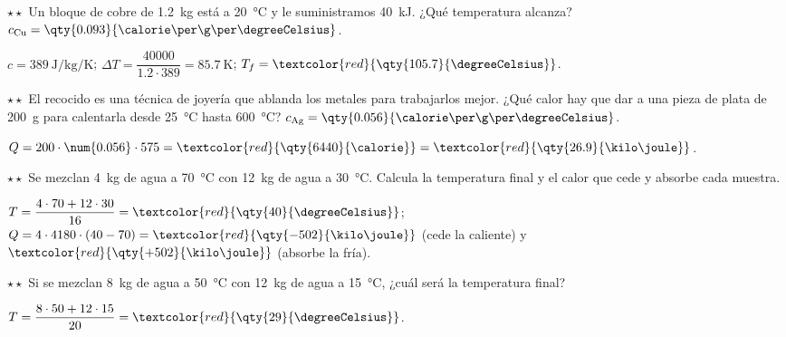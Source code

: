 \begin{exercise}
    \(\star\star\) Un bloque de cobre de \qty{1.2}{\kg} está a \qty{20}{\degreeCelsius} y le suministramos \qty{40}{\kilo\joule}. ¿Qué
    temperatura alcanza? \(c_{\text{Cu}} = \qty{0.093}{\calorie\per\g\per\degreeCelsius}\).
    \begin{solu}
        \(c = \qty{389}{\joule\per\kg\per\kelvin}\); \(\Delta T = \dfrac{40000}{\num{1.2} \cdot 389} = \qty{85.7}{\kelvin}\);
        \(T_f = \textcolor{red}{\qty{105.7}{\degreeCelsius}}\).
    \end{solu}
\end{exercise}

\begin{exercise}
    \(\star\star\) El recocido es una técnica de joyería que ablanda los metales para trabajarlos mejor. ¿Qué calor hay que dar a una
    pieza de plata de \qty{200}{\g} para calentarla desde \qty{25}{\degreeCelsius} hasta \qty{600}{\degreeCelsius}?
    \(c_{\text{Ag}} = \qty{0.056}{\calorie\per\g\per\degreeCelsius}\).
    \begin{solu}
        \(Q = 200 \cdot \num{0.056} \cdot 575 = \textcolor{red}{\qty{6440}{\calorie}} = \textcolor{red}{\qty{26.9}{\kilo\joule}}\).
    \end{solu}
\end{exercise}

\begin{exercise}
    \(\star\star\) Se mezclan \qty{4}{\kg} de agua a \qty{70}{\degreeCelsius} con \qty{12}{\kg} de agua a \qty{30}{\degreeCelsius}.
    Calcula la temperatura final y el calor que cede y absorbe cada muestra.
    \begin{solu}
        \(T = \dfrac{4 \cdot 70 + 12 \cdot 30}{16} = \textcolor{red}{\qty{40}{\degreeCelsius}}\); \(Q = 4 \cdot 4180 \cdot (40 - 70)
        = \textcolor{red}{\qty{-502}{\kilo\joule}}\) (cede la caliente) y \(\textcolor{red}{\qty{+502}{\kilo\joule}}\) (absorbe la fría).
    \end{solu}
\end{exercise}

\begin{exercise}
    \(\star\star\) Si se mezclan \qty{8}{\kg} de agua a \qty{50}{\degreeCelsius} con \qty{12}{\kg} de agua a \qty{15}{\degreeCelsius},
    ¿cuál será la temperatura final?
    \begin{solu}
        \(T = \dfrac{8 \cdot 50 + 12 \cdot 15}{20} = \textcolor{red}{\qty{29}{\degreeCelsius}}\).
    \end{solu}
\end{exercise}


